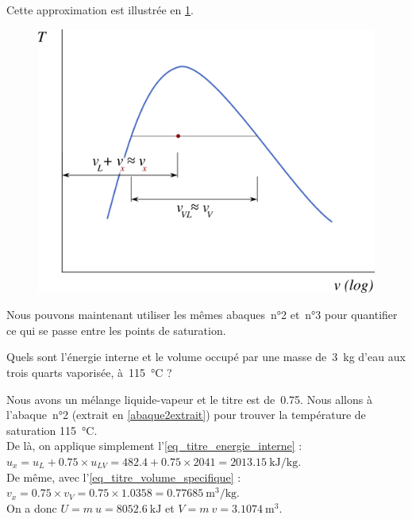 \begin{description}
{				Cette approximation est illustrée en \cref{fig_titre_v}.

				\begin{figure}
					\begin{center}
						\includegraphics[width=\didacticpvdiagramwidth]{images/titre_tv_v2.png}
					\end{center}
					\label{fig_titre_v}
				\end{figure}
			} %

		\end{description}
		 
		\clearfloats %
		Nous pouvons maintenant utiliser les mêmes abaques~n°2 et~n°3 pour quantifier ce qui se passe entre les points de saturation.
		
			\begin{anexample}
			
			Quels sont l’énergie interne et le volume occupé par une masse de~\SI{3}{\kilogram} d’eau aux trois quarts vaporisée, à~\SI{115}{\degreeCelsius} ?
			
				\begin{answer}
				Nous avons un mélange liquide-vapeur et le titre est de~\num{0,75}. Nous allons à l’abaque~n°2 (extrait en \cref{abaque2extrait}) pour trouver la température de saturation \SI{115}{\degreeCelsius}.\\
				De là, on applique simplement l’\cref{eq_titre_energie_interne} : $u_x = u_L + \num{0,75}\times u_{LV} = \num{482,4} + \num{0,75}\times\num{2041} = \SI{2013,15}{\kilo\joule\per\kilogram}$.\\
				De même, avec l’\cref{eq_titre_volume_specifique} : $v_x = \num{0,75}\times v_{V} = \num{0,75}\times\num{1,0358} = \SI{0,77685}{\metre\cubed\per\kilogram}$.\\				
				On a donc $U = m \ u = \SI{8052,6}{\kilo\joule} $ et $V = m \ v = \SI{3,1074}{\metre\cubed}$.
				\end{answer}
			\end{anexample}
		
